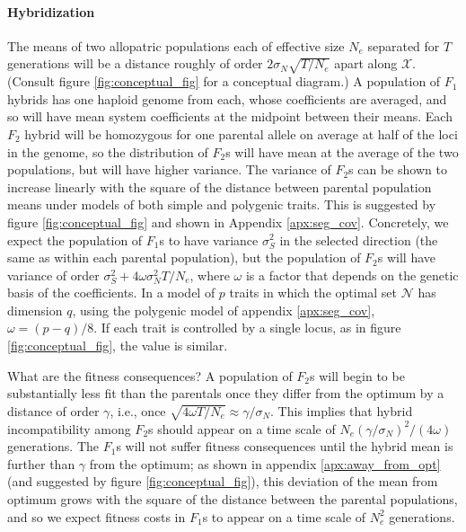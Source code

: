 \documentclass{article}
\newcommand{\plr}[1]{\todo[color=blue!25]{#1}}
\newcommand{\plr}[1]{{\color{blue}\it #1}}
\newcommand{\1}{\mathbbm{1}}
\newcommand{\allS}{\mathcal{N}}
\newcommand{\optx}{\mathcal{X}}
\begin{document}
\paragraph{Hybridization}
The means of two allopatric populations each of effective size $N_e$ separated for $T$ generations
will be a distance roughly of order $2\sigma_N \sqrt{T/N_e}$ apart along $\optx$.
(Consult figure \ref{fig:conceptual_fig} for a conceptual diagram.)
A population of $F_1$ hybrids has one haploid genome from each,
whose coefficients are averaged,
and so will have mean system coefficients at the midpoint between their means.
Each $F_2$ hybrid will be homozygous for one parental allele on average at half of the loci in the genome,
so the distribution of $F_2$s will have mean at the average of the two populations,
but will have higher variance.
The variance of $F_2$s can be shown to increase linearly with the square of the distance between
parental population means
under models of both simple and polygenic traits.
This is suggested by figure \ref{fig:conceptual_fig} and shown in Appendix \ref{apx:seg_cov}.
\plr{connect to Barton etc polygenic adaptation lit}
Concretely, we expect the population of $F_1$s to have variance $\sigma^2_S$ in the selected direction
(the same as within each parental population),
but the population of $F_2$s will have variance of order $\sigma^2_S + 4 \omega \sigma^2_N T/N_e$,
where $\omega$ is a factor that depends on the genetic basis of the coefficients.
In a model of $p$ traits in which the optimal set $\allS$ has dimension $q$,
using the polygenic model of appendix \ref{apx:seg_cov}, $\omega = (p-q)/8$.
If each trait is controlled by a single locus, as in figure \ref{fig:conceptual_fig},
the value is similar.

What are the fitness consequences?
A population of $F_2$s will begin to be substantially less fit than the parentals
once they differ from the optimum by a distance of order $\gamma$,
i.e., once $\sqrt{4 \omega T/N_e} \approx \gamma / \sigma_N$.
This implies that hybrid incompatibility among $F_2$s should appear on a time scale of 
$N_e (\gamma / \sigma_N)^2 / (4 \omega)$ generations.
The $F_1$s will not suffer fitness consequences until the hybrid mean is further than $\gamma$ from the optimum;
as shown in appendix \ref{apx:away_from_opt} (and suggested by figure \ref{fig:conceptual_fig}),
this deviation of the mean from optimum grows with the square of the distance between the parental populations,
and so we expect fitness costs in $F_1$s to appear on a time scale of $N_e^2$ generations.
\end{document}
